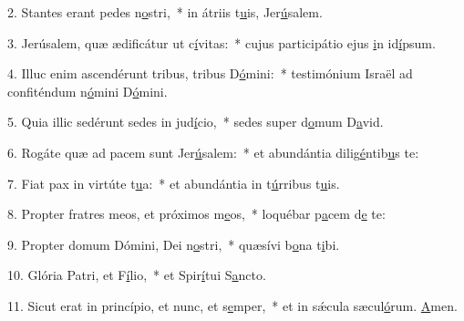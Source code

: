 2. Stantes erant pedes n\uline{o}stri,~* in átriis t\uline{u}is, Jer\uline{ú}salem.\par 
3. Jerúsalem, quæ ædificátur ut c\uline{í}vitas:~* cujus participátio ejus \uline{i}n id\uline{í}psum.\par 
4. Illuc enim ascendérunt tribus, tribus D\uline{ó}mini:~* testimónium Israël ad confiténdum n\uline{ó}mini D\uline{ó}mini.\par 
5. Quia illic sedérunt sedes in jud\uline{í}cio,~* sedes super d\uline{o}mum D\uline{a}vid.\par 
6. Rogáte quæ ad pacem sunt Jer\uline{ú}salem:~* et abundántia dilig\uline{é}ntib\uline{u}s te:\par 
7. Fiat pax in virtúte t\uline{u}a:~* et abundántia in t\uline{ú}rribus t\uline{u}is.\par 
8. Propter fratres meos, et próximos m\uline{e}os,~* loquébar p\uline{a}cem d\uline{e} te:\par 
9. Propter domum Dómini, Dei n\uline{o}stri,~* quæsívi b\uline{o}na t\uline{i}bi.\par 
10. Glória Patri, et F\uline{í}lio,~* et Spir\uline{í}tui S\uline{a}ncto.\par 
11. Sicut erat in princípio, et nunc, et s\uline{e}mper,~* et in sǽcula sæcul\uline{ó}rum. \uline{A}men.\par 
